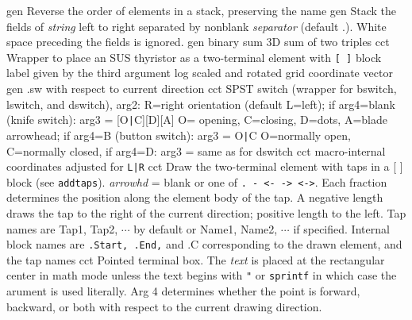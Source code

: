   {gen}
  {Reverse the order of elements in a stack, preserving the name}
  {gen}
  {Stack the fields of {\sl string} left to right separated by nonblank
    {\sl separator} (default .).  White space preceding the fields is ignored.}
  {gen}
  {binary sum}
  {3D}
  {sum of two triples}
  {cct}
  {Wrapper to place an SUS thyristor as a two-terminal element with
   {\tt [ ]} block label given by the third argument
    }
  {log}
  {scaled and rotated grid coordinate vector}
  {gen}
  {.sw with respect to current direction}
  {cct}
  {SPST switch (wrapper for bswitch, lswitch, and dswitch),
    arg2: R=right orientation (default L=left);
     if arg4=blank (knife switch): arg3 = [O{\tt|}C][D][A]
       O= opening, C=closing, D=dots, A=blade arrowhead;
     if arg4=B (button switch): arg3 = O{\tt|}C
       O=normally open, C=normally closed,
     if arg4=D: arg3 = same as for dswitch }
  {cct}
  {macro-internal coordinates adjusted for {\tt L|R}}
  {cct}
  {Draw the two-terminal element with taps in a [ ] block (see {\tt addtaps}).
   {\sl arrowhd} = blank or one of {\tt . - <- -> <->}.
   Each fraction determines the position along the element body of the tap.
   A negative length draws the tap to the right of the current
   direction; positive length to the left.
   Tap names are Tap1, Tap2, $\cdots$ by default  or
   Name1, Name2, $\cdots$ if specified.
   Internal block names are {\tt .Start, .End,} and {.C} corresponding to the
   drawn element, and the tap names 
    }
  {cct}
  {Pointed terminal box. The {\sl text} is placed at the rectangular center
   in math mode unless the text begins with {\tt "} or {\tt sprintf} in which
   case the arument is used literally.  Arg 4 determines whether the point is
   forward, backward, or both with respect to the current drawing direction.
    }
